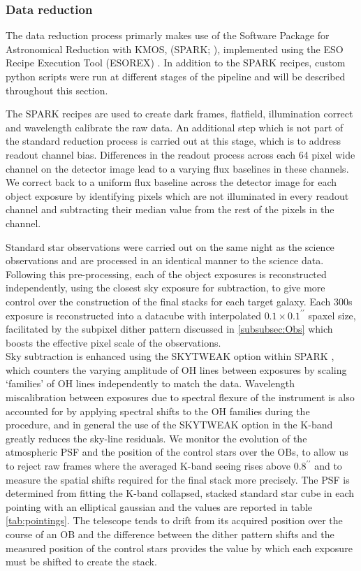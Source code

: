 \documentclass[fleqn,usenatbib]{mn2e}
\begin{document}
\subsubsection{Data reduction}\label{subsubsec:datareduction}
The data reduction process primarly makes use of the Software Package for Astronomical Reduction with KMOS, (SPARK; \cite{Davies2013}), implemented using the ESO Recipe Execution Tool (ESOREX) \citep{Freudling2013}.
In addition to the SPARK recipes, custom python scripts were run at different stages of the pipeline and will be described throughout this section.

The SPARK recipes are used to create dark frames, flatfield, illumination correct and wavelength calibrate the raw data.
An additional step which is not part of the standard reduction process is carried out at this stage, which is to address readout channel bias.
Differences in the readout process across each 64 pixel wide channel on the detector image lead to a varying flux baselines in these channels.
We correct back to a uniform flux baseline across the detector image for each object exposure by identifying pixels which are not illuminated in every readout channel and subtracting their median value from the rest of the pixels in the channel.

Standard star observations were carried out on the same night as the science observations and are processed in an identical manner to the science data.
Following this pre-processing, each of the object exposures is reconstructed independently, using the closest sky exposure for subtraction, to give more control over the construction of the final stacks for each target galaxy.
Each 300s exposure is reconstructed into a datacube with interpolated $0.1\times0.1^{\prime\prime}$ spaxel size, facilitated by the subpixel dither pattern discussed in \cref{subsubsec:Obs} which boosts the effective pixel scale of the observations. \\

Sky subtraction is enhanced using the SKYTWEAK option within SPARK \citep{Davies2007}, which counters the varying amplitude of OH lines between exposures by scaling `families' of OH lines independently to match the data.
Wavelength miscalibration between exposures due to spectral flexure of the instrument is also accounted for by applying spectral shifts to the OH families during the procedure, and in general the use of the SKYTWEAK option in the K-band greatly reduces the sky-line residuals. 
We monitor the evolution of the atmospheric PSF and the position of the control stars over the OBs, to allow us to reject raw frames where the averaged K-band seeing rises above $0.8^{\prime\prime}$ and to measure the spatial shifts required for the final stack more precisely.
The PSF is determined from fitting the K-band collapsed, stacked standard star cube in each pointing with an elliptical gaussian and the values are reported in table \ref{tab:pointings}.
The telescope tends to drift from its acquired position over the course of an OB and the difference between the dither pattern shifts and the measured position of the control stars provides the value by which each exposure must be shifted to create the stack. \\
\end{document}
